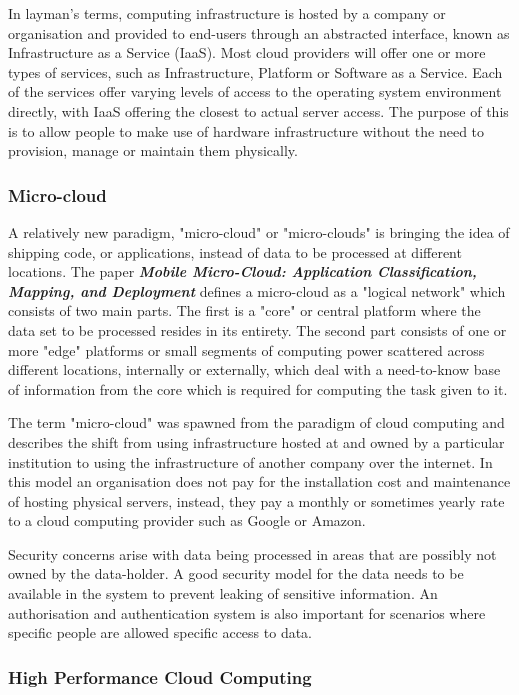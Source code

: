 In layman's terms, computing infrastructure is hosted by a company or organisation and provided to end-users through an abstracted interface, known as Infrastructure as a Service (IaaS). Most cloud providers will offer one or more types of services, such as Infrastructure, Platform or Software as a Service. Each of the services offer varying levels of access to the operating system environment directly, with IaaS offering the closest to actual server access. The purpose of this is to allow people to make use of hardware infrastructure without the need to provision, manage or maintain them physically.

\subsubsection{Micro-cloud}

A relatively new paradigm, "micro-cloud" or "micro-clouds" is bringing the idea of shipping code, or applications, instead of data to be processed at different locations. The paper \textbf{\textit{Mobile Micro-Cloud: Application Classification, Mapping, and Deployment}} \parencite{wang2013mobile} defines a micro-cloud as a "logical network" which consists of two main parts. The first is a "core" or central platform where the data set to be processed resides in its entirety. The second part consists of one or more "edge" platforms or small segments of computing power scattered across different locations, internally or externally, which deal with a need-to-know base of information from the core which is required for computing the task given to it.

The term "micro-cloud" was spawned from the paradigm of cloud computing and describes the shift from using infrastructure hosted at and owned by a particular institution to using the infrastructure of another company over the internet. In this model an organisation does not pay for the installation cost and maintenance of hosting physical servers, instead, they pay a monthly or sometimes yearly rate to a cloud computing provider such as Google or Amazon.

Security concerns arise with data being processed in areas that are possibly not owned by the data-holder. A good security model for the data needs to be available in the system to prevent leaking of sensitive information. An authorisation and authentication system is also important for scenarios where specific people are allowed specific access to data. 

\subsubsection{High Performance Cloud Computing}

